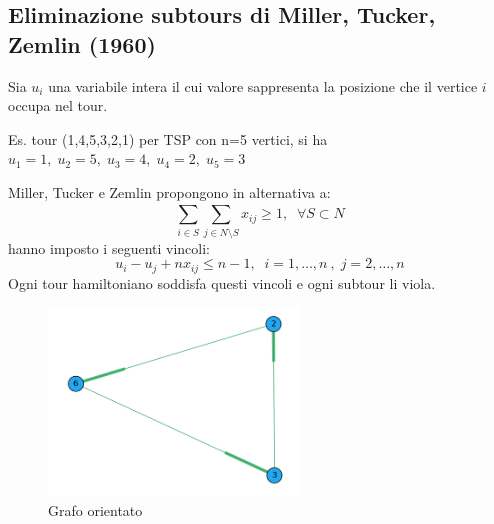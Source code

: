 \subsection{Eliminazione subtours di Miller, Tucker, Zemlin (1960)}
Sia $u_{i}$ una variabile intera il cui valore sappresenta la posizione che il vertice $i$ occupa nel tour.

\begin{center}
	Es. tour (1,4,5,3,2,1) per TSP con n=5 vertici, si ha $u_{1}=1,\;u_{2}=5,\;u_{3}=4,\;u_{4}=2,\;u_{5}=3$	
\end{center}

Miller, Tucker e Zemlin propongono in alternativa a:
\begin{equation}\tag{*}
	\sum_{i\in S}^{}\sum_{j\in N\setminus S}^{} x_{ij} \ge 1,\;\;\forall S\subset N
\end{equation}
hanno imposto i seguenti vincoli:
\begin{equation}
	u_{i}-u_{j}+nx_{ij}\le n-1,\;\; i=1,\dots,n\:,\;j=2,\dots,n
\end{equation}
Ogni tour hamiltoniano soddisfa questi vincoli e ogni subtour li viola.\newline
\begin{figure}
	\vspace{-2em}
	\includegraphics[height=5cm]{images/graph1.png}
	\caption{Grafo orientato}
\end{figure}
\newpage

